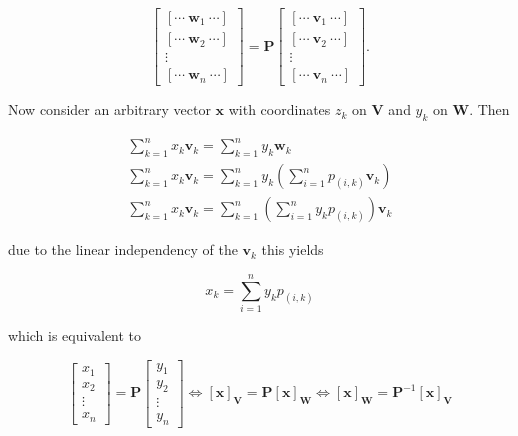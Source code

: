 \begin{equation}\left[\begin{array}{c} \left[\cdots\ \mathbf{w}_1\ \cdots \right] \\[5mm] \left[\cdots\ \mathbf{w}_2\  \cdots \right] \\[5mm]  \vdots  \\[5mm] \left[\cdots\ \mathbf{w}_n\ \cdots \right] \end{array}\right] = \mathbf{P}\left[\begin{array}{c} \left[\cdots\ \mathbf{v}_1\ \cdots \right] \\[5mm] \left[\cdots\ \mathbf{v}_2\  \cdots \right] \\[5mm]  \vdots  \\[5mm] \left[\cdots\ \mathbf{v}_n\ \cdots \right] \end{array}\right]. \end{equation}

	Now consider an arbitrary vector $\mathbf{x}$ with coordinates $z_k$ on $\mathbf{V}$ and $y_k$ on $\mathbf{W}$. Then

\begin{gather}
	\sum\limits_{k=1}^n x_k\mathbf{v}_k = \sum\limits_{k=1}^n y_k\mathbf{w}_k \nonumber\\[5mm]
	\sum\limits_{k=1}^n x_k\mathbf{v}_k = \sum\limits_{k=1}^n y_k \left( \sum\limits_{i=1}^n p_{\left(i,k\right)}\mathbf{v}_k\right) \nonumber\\[5mm]
	\sum\limits_{k=1}^n x_k\mathbf{v}_k = \sum\limits_{k=1}^n \left( \sum\limits_{i=1}^n y_k p_{\left(i,k\right)}\right) \mathbf{v}_k
\end{gather}

	\noindent due to the linear independency of the $\mathbf{v}_k$ this yields

\begin{equation}
	x_k = \sum\limits_{i=1}^n y_k p_{\left(i,k\right)}
\end{equation}

	\noindent which is equivalent to

\begin{equation} \left[\begin{array}{c} x_1 \\[3mm] x_2\\[3mm] \vdots \\[3mm] x_n\end{array}\right] = \mathbf{P}\left[\begin{array}{c} y_1 \\[3mm] y_2\\[3mm] \vdots \\[3mm] y_n\end{array}\right] \Leftrightarrow \left[\mathbf{x}\right]_\mathbf{V} = \mathbf{P}\left[\mathbf{x}\right]_\mathbf{W}\Leftrightarrow \left[\mathbf{x}\right]_\mathbf{W} = \mathbf{P}^{-1}\left[\mathbf{x}\right]_\mathbf{V} \label{eq:coordinate_transform}\end{equation}

